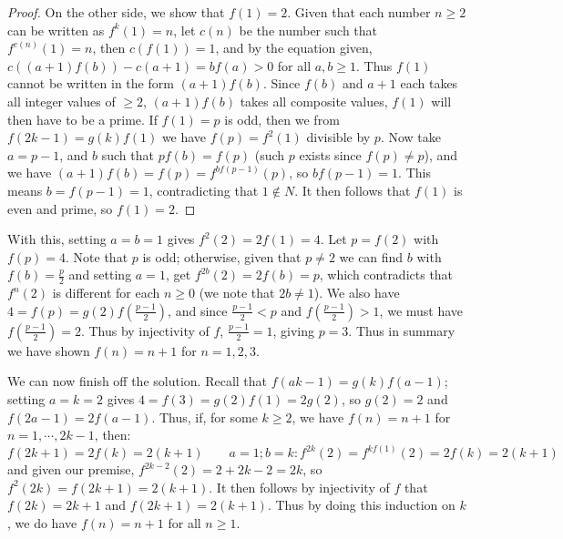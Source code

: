 \documentclass[11pt,a4paper]{article}
\begin{document}
\begin{enumerate}
\begin{proof}
    		On the other side, we show that $f(1) = 2$. 
    		Given that each number $n\ge 2$ can be written as $f^k(1)=n$, let $c(n)$ be the number such that $f^{c(n)}(1)=n$, 
    		then $c(f(1))=1$, and by the equation given, $c((a+1)f(b)) - c(a + 1) = bf(a) > 0$ for all $a, b\ge 1$. 
    		Thus $f(1)$ cannot be written in the form $(a+1)f(b)$. 
    		Since $f(b)$ and $a + 1$ each takes all integer values of $\ge 2$, 
    		$(a+1)f(b)$ takes all composite values, $f(1)$ will then have to be a prime.
    		If $f(1) = p$ is odd, 
    		then we from $f(2k-1) = g(k)f(1)$ we have $f(p)=f^2(1)$ divisible by $p$. 
    		Now take $a = p - 1$, and $b$ such that $p f(b) = f(p)$ (such $p$ exists since $f(p) \neq p$), 
    		and we have $(a + 1)f(b) = f(p) = f^{bf(p - 1)}(p)$, 
    		so $bf(p-1)=1$. This means $b=f(p-1)=1$, 
    		contradicting that $1\not\in N$. 
    		It then follows that $f(1)$ is even and prime, so $f(1) = 2$. 
    	\end{proof}
    	
    	
    	With this, setting $a=b=1$ gives $f^2(2)=2f(1)=4$. 
    	Let $p = f(2)$ with $f(p) = 4$. 
    	Note that $p$ is odd; 
    	otherwise, given that $p\neq 2$ we can find $b$ with $f(b) = \frac{p}{2}$ and setting $a=1$, get $f^{2b}(2)=2f(b) = p$, 
    	which contradicts that $f^n(2)$ is different for each $n\ge 0$ 
    	(we note that $2b\neq 1$). 
    	We also have $4 = f(p) = g(2)f(\frac{p - 1}{2})$, 
    	and since $\frac{p-1}{2} < p$ and $f(\frac{p - 1}{2}) > 1$, 
    	we must have $f(\frac{p - 1}{2}) = 2$. 
    	Thus by injectivity of $f$, 
    	$\frac{p - 1}{2} = 1$, giving $p=3$. 
    	Thus in summary we have shown $f(n) = n + 1$ for $n = 1, 2, 3$. 
    	
    	We can now finish off the solution. 
    	Recall that $f(ak-1)=g(k)f(a-1)$; setting $a=k=2$ gives $4=f(3)=g(2)f(1)=2g(2)$, 
    	so $g(2)=2$ and $f(2a-1) = 2f(a - 1)$. 
    	Thus, if, for some $k\ge 2$, we have 
    	$f(n) = n + 1$ for $n=1, \cdots, 2k-1$, then: 
    	\[
    	f(2k + 1) = 2f(k) = 2(k + 1)\qquad 
    	a = 1; b = k: f^{2k}(2) = f^{kf(1)}(2) = 2f(k) = 2(k + 1)
    	\]
    	and given our premise, $f^{2k - 2}(2) = 2 + 2k - 2 = 2k$, 
    	so $f^2(2k) = f(2k + 1) = 2(k + 1)$. 
    	It then follows by injectivity of $f$ that $f(2k) = 2k + 1$ and $f(2k + 1) = 2(k + 1)$. 
    	Thus by doing this induction on $k$, we do have $f(n) = n + 1$ for all $n \ge 1$. 
    \end{enumerate}
    
\end{document}
